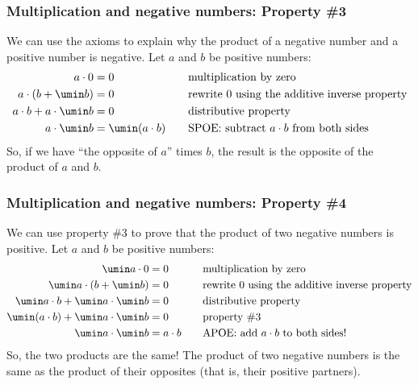 \subsubsection{Multiplication and negative numbers: Property \#3}
We can use the axioms to explain why the product of a negative number and a positive number is negative. Let $a$ and $b$ be positive numbers:
\[\begin{aligned}
a \cdot 0 &= 0
&& \quad\text{multiplication by zero}
\\
a \cdot (b + \umin b) &= 0
&& \quad\text{rewrite 0 using the additive inverse property}
\\
a \cdot b + a \cdot \umin b &= 0
&& \quad\text{distributive property}
\\
a \cdot \umin b &= \umin (a \cdot b)
&& \quad\text{SPOE: subtract $a \cdot b$ from both sides}
\end{aligned}\]
So, if we have ``the opposite of $a$'' times $b$, the result is the opposite of the product of $a$ and $b$.

\subsubsection{Multiplication and negative numbers: Property \#4}
We can use property \#3 to prove that the product of two negative numbers is positive. Let $a$ and $b$ be positive numbers:
\[\begin{aligned}
\umin a \cdot 0 &= 0
&& \quad\text{multiplication by zero}
\\
\umin a \cdot (b + \umin b) &= 0
&& \quad\text{rewrite 0 using the additive inverse property}
\\
\umin a \cdot b + \umin a \cdot \umin b &= 0
&& \quad\text{distributive property}
\\
\umin (a \cdot b) + \umin a \cdot \umin b &= 0
&& \quad\text{property \#3}
\\
\umin a \cdot \umin b &= a\cdot b
&& \quad\text{APOE: add $a\cdot b$ to both sides!}
\end{aligned}\]
So, the two products are the same! The product of two negative numbers is the same as the product of their opposites (that is, their positive partners).

